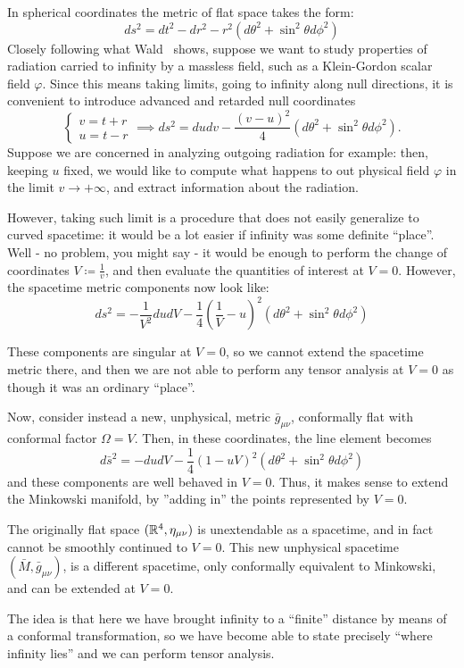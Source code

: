 In spherical coordinates the metric of flat space takes the form:
\[
ds^2 = dt^2 - dr^2 - r^2(d\theta^2 + \sin^2\theta d\phi^2)
\]
Closely following what Wald~\cite{wald2010general} shows, suppose we want to study properties of radiation carried to infinity by a massless field, such as a Klein-Gordon scalar field \(\varphi\). Since this means taking limits, going to infinity along null directions, it is convenient to introduce advanced and retarded null coordinates
\[
\begin{cases}
	 v = t + r\\
	 u = t - r
\end{cases}
\implies 
ds^2 = dudv - \frac{(v - u)^2}{4}(d\theta^2 + \sin^2\theta d\phi^2).
\]
Suppose we are concerned in analyzing outgoing radiation for example: then, keeping \(u\) fixed, we would like to compute what happens to out physical field \(\varphi\) in the limit \(v \rightarrow +\infty\), and extract information about the radiation.

However, taking such limit is a procedure that does not easily generalize to curved spacetime: it would be a lot easier if infinity was some definite ``place''. Well - no problem, you might say - it would be enough to perform the change of coordinates \(V\coloneqq \frac{1}{v}\), and then evaluate the quantities of interest at \(V = 0\). However, the spacetime metric components now look like:
\[
ds^2 = -\frac{1}{V^2}dudV - \frac{1}{4}\left(\frac{1}{V} - u\right)^2 (d\theta^2 + \sin^2\theta d\phi^2)
\]

These components are singular at \(V = 0\), so we cannot extend the spacetime metric there, and then we are not able to perform any tensor analysis at \(V = 0\) as though it was an ordinary ``place''. 

Now, consider instead a new, unphysical, metric \(\bar{g}_{\mu\nu}\), conformally flat with conformal factor \(\Omega = V\). Then, in these coordinates, the line element becomes
\[
d\bar{s}^2 = -dudV - \frac{1}{4}\left(1- uV\right)^2 (d\theta^2 + \sin^2\theta d\phi^2)
\]
and these components are well behaved in \(V = 0\). Thus, it makes sense to extend the Minkowski manifold, by ''adding in'' the points represented by \(V = 0\).
\begin{remark}
	The originally flat space \(({\mathbb{R}}^4, \eta_{\mu\nu})\) is unextendable as a spacetime, and in fact cannot be smoothly continued to \(V = 0\). This new unphysical spacetime \((\bar{M},\bar{g}_{\mu\nu} )\), is a different spacetime, only conformally equivalent to Minkowski, and can be extended at \(V = 0\).
\end{remark}
The idea is that here we have brought infinity to a ``finite'' distance by means of a conformal transformation, so we have become able to state precisely ``where infinity lies'' and we can perform tensor analysis.

